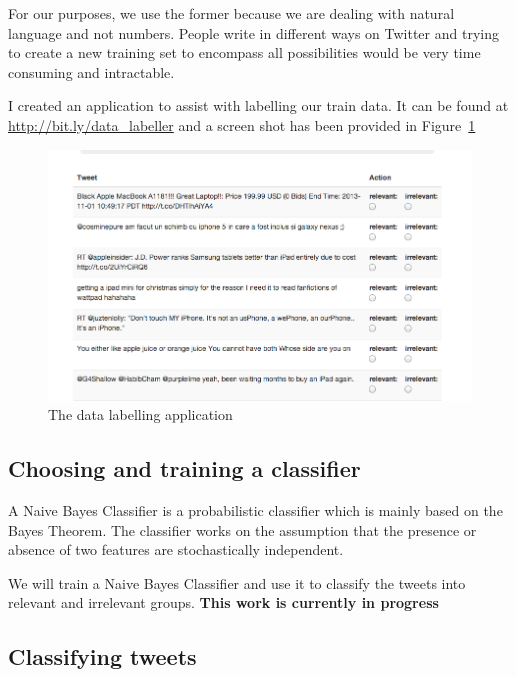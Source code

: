 For our purposes, we use the former because we are dealing with natural language and not numbers.
People write in different ways on Twitter and trying to create a new training set to encompass all
possibilities would be very time consuming and intractable.

I created an application to assist with labelling our train data. It can be found at
\url{http://bit.ly/data\_labeller} and a screen shot has been provided in Figure~\ref{fig:labeller}

\begin{figure}
  \begin{center}
    \includegraphics[scale=0.6]{figures/datalabeller}
  \end{center}
  \caption{The data labelling application}
\label{fig:labeller}
\end{figure}


\subsection{Choosing and training a classifier}
A Naive Bayes Classifier is a probabilistic classifier which is mainly based on the Bayes Theorem.
The classifier works on the assumption that the presence or absence of two features are
stochastically independent.

We will train a Naive Bayes Classifier and use it to classify the tweets into relevant and
irrelevant groups. \textbf{This work is currently in progress}

\subsection{Classifying tweets}

